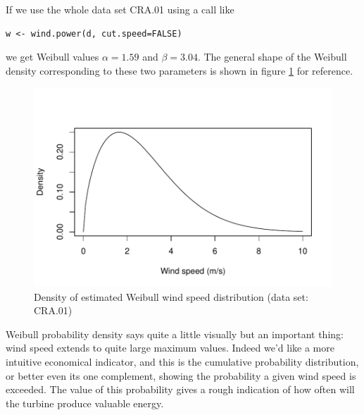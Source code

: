 \documentclass[a4paper,10pt]{book}
\begin{document}
If we use the whole data set CRA.01 using a call like

\begin{verbatim}
w <- wind.power(d, cut.speed=FALSE)
\end{verbatim}

\noindent we get Weibull values $ \alpha = 1.59 $ and $ \beta = 3.04 $. The general shape of the Weibull density corresponding to these two parameters is shown in figure \ref{fig:CRA01 Weibull} for reference.

\begin{figure}[htp]
 \centering
 \begin{center}
 \includegraphics[scale=0.80,keepaspectratio=true]{./diagrams/CRA01_Weibull.pdf}
 \end{center}
 \caption{Density of estimated Weibull wind speed distribution (data set: CRA.01)}
 \label{fig:CRA01 Weibull}
\end{figure}

Weibull probability density says quite a little visually but an important thing: wind speed extends to quite large maximum values. Indeed we'd like a more intuitive economical indicator, and this is the cumulative probability distribution, or better even its one complement, showing the probability a given wind speed is exceeded. The value of this probability gives a rough indication of how often will the turbine produce valuable energy.
\end{document}
